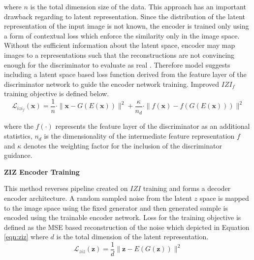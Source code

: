 where $n$ is the total dimension size of the data.
This approach has an important drawback regarding to latent representation. Since the distribution
of the latent representation of the input image is not known, the encoder is trained only using a
form of contextual loss which enforce the similarity only in the image space. Without the
sufficient information about the latent space, encoder may map images to a representations such
that the reconstructions are not convincing enough for the discriminator to evaluate as real
\cite{pub.1111824956}. Therefore model suggests including a latent space based loss
function derived from the feature layer of the discriminator network to guide the encoder network 
training. Improved $IZI_{f}$ training objective is defined below.
\begin{equation}
	\mathcal{L}_{i z i_{f}}(\mathbf{x})=\frac{1}{n} \cdot\|\mathbf{x}-G(E(\mathbf{x}))\|^{2}+\frac{\kappa}{n_{d}} \cdot\|f(\mathbf{x})-f(G(E(\mathbf{x})))\|^{2}
\end{equation}

where the $f(\cdot)$ represents the feature layer of the discriminator as an additional statistics, $n_{d}$ is
the dimensionality of the intermediate feature representation $f$ and $\kappa$ denotes the weighting
factor for the inclusion of the discriminator guidance.

\textbf{ZIZ Encoder Training}

This method reverses pipeline created on $IZI$ training and forms a decoder
encoder architecture. A random sampled noise from the latent $z$ space is mapped to the image space using the
fixed generator and then generated sample is encoded using the trainable encoder network. Loss
for the training objective is defined as the MSE based reconstruction of the noise which depicted in Equation
\ref{eqn:ziz} where $d$ is the total dimension of the latent representation.
\begin{equation}
\label{eqn:ziz}
	\mathcal{L}_{z i z}(\mathbf{z})=\frac{1}{d}\|\mathbf{z}-E(G(\mathbf{z}))\|^{2}
\end{equation}

